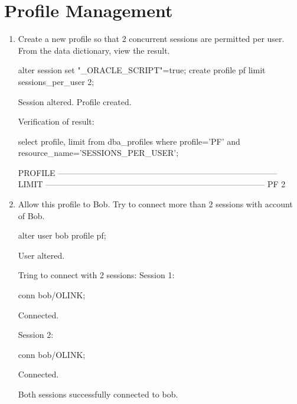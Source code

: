 \documentclass{article}
\begin{document}
\section{Profile Management}
\begin{enumerate}
\item{Create a new profile so that 2 concurrent sessions are permitted per user. From the data dictionary, view the result.}
\begin{sqlshell}
alter session set "_ORACLE_SCRIPT"=true;  
create profile pf limit sessions_per_user 2;
\end{sqlshell}
\begin{messageshell}
Session altered.
Profile created.
\end{messageshell}
Verification of result:
\begin{sqlshell}
select profile, limit from dba_profiles where profile='PF' and resource_name='SESSIONS_PER_USER';
\end{sqlshell}
\begin{messageshell}
PROFILE
--------------------------------------------------------------------------------
LIMIT
--------------------------------------------------------------------------------
PF
2

\end{messageshell}
\item{Allow this profile to Bob. Try to connect more than 2 sessions with account of Bob.}
\begin{sqlshell}
alter user bob profile pf;
\end{sqlshell}
\begin{messageshell}
User altered.
\end{messageshell}
Tring to connect with 2 sessions:
Session 1:
\begin{sqlshell}
conn bob/OLINK;
\end{sqlshell}
\begin{messageshell}
Connected.
\end{messageshell}
Session 2:
\begin{sqlshell}
conn bob/OLINK;
\end{sqlshell}
\begin{messageshell}
Connected.
\end{messageshell}
Both sessions successfully connected to bob.
\end{enumerate}
\end{document}
